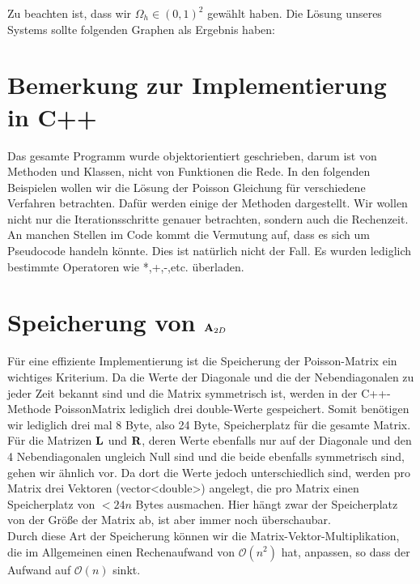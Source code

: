 Zu beachten ist, dass wir $\Omega_{h} \in (0,1)^{2}$ gewählt haben. Die Lösung unseres Systems sollte folgenden Graphen als Ergebnis haben:


\section{Bemerkung zur Implementierung in C++}

Das gesamte Programm wurde objektorientiert geschrieben, darum ist von Methoden und Klassen, nicht von Funktionen die Rede. In den folgenden Beispielen wollen wir die Lösung der Poisson Gleichung für verschiedene Verfahren betrachten. Dafür werden einige der Methoden dargestellt. Wir wollen nicht nur die Iterationsschritte genauer betrachten, sondern auch die Rechenzeit.\\
An manchen Stellen im Code kommt die Vermutung auf, dass es sich um Pseudocode handeln könnte. Dies ist natürlich nicht der Fall. Es wurden lediglich bestimmte Operatoren wie *,+,-,etc. überladen.

\section{Speicherung von ${\textbf{A}}_{2D}$}

Für eine effiziente Implementierung ist die Speicherung der Poisson-Matrix ein wichtiges Kriterium. Da die Werte der Diagonale und die der Nebendiagonalen zu jeder Zeit bekannt sind und die Matrix symmetrisch ist, werden in der C++-Methode PoissonMatrix lediglich drei double-Werte gespeichert. Somit benötigen wir lediglich drei mal 8 Byte, also 24 Byte, Speicherplatz für die gesamte Matrix.\\
Für die Matrizen ${\textbf{L}}$ und ${\textbf{R}}$, deren Werte ebenfalls nur auf der Diagonale und den 4 Nebendiagonalen ungleich Null sind und die beide ebenfalls symmetrisch sind, gehen wir ähnlich vor. Da dort die Werte jedoch unterschiedlich sind, werden pro Matrix drei Vektoren (vector<double>) angelegt, die pro Matrix einen Speicherplatz von  $< 24n$ Bytes ausmachen. Hier hängt zwar der Speicherplatz von der Größe der Matrix ab, ist aber immer noch überschaubar.\\
Durch diese Art der Speicherung können wir die Matrix-Vektor-Multiplikation, die im Allgemeinen einen Rechenaufwand von $\mathcal{O}(n^{2})$ hat, anpassen, so dass der Aufwand auf $\mathcal{O}(n)$ sinkt.

